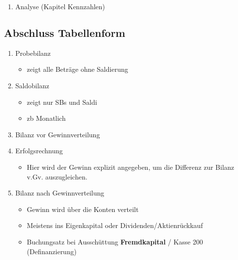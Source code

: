 \begin{enumerate}
\begin{itemize}
        \item Beispiel
        \begin{itemize}
            \item Gewinn 50k
            \item 25k im unternehmen (Eigenkapital)
            \item 25k Ausschüttung (Dividenden, \textbf{Aktienrückkauf}) \footnote{Wie siehts in der Schweiz aus, Dividendesteuer etc?} \footnote{Das Kapital fliesst in der Richtung der grössten Profitraten. Woher und wie es überhaupt möglich ist aus dem Tausch, oder Kauf und Verkauf von Äquivalente Mehrwert zu schaffen, bleibt unberuht.}
        \end{itemize}
    \end{itemize}
    \item Analyse (Kapitel Kennzahlen)
\end{enumerate}

\pagebreak
\subsection{Abschluss Tabellenform}

\begin{enumerate}
    \item Probebilanz
    \begin{itemize}
        \item zeigt alle Beträge ohne Saldierung
    \end{itemize}
    \item Saldobilanz
    \begin{itemize}
        \item zeigt nur SBs und Saldi
        \item zb Monatlich
    \end{itemize}
    \item Bilanz vor Gewinnverteilung
    \item Erfolgsrechnung
    \begin{itemize}
        \item Hier wird der Gewinn explizit angegeben, um die Differenz zur Bilanz v.Gv. auszugleichen.
    \end{itemize} 
    \item Bilanz nach Gewinnverteilung
    \begin{itemize}
        \item Gewinn wird über die Konten verteilt
        \item Meistens ins Eigenkapital oder Dividenden/Aktienrückkauf
        \item Buchungsatz bei Ausschüttung
        \subitem \textbf{Fremdkapital} / Kasse 200 (Definanzierung)
    \end{itemize} 
\end{enumerate}

